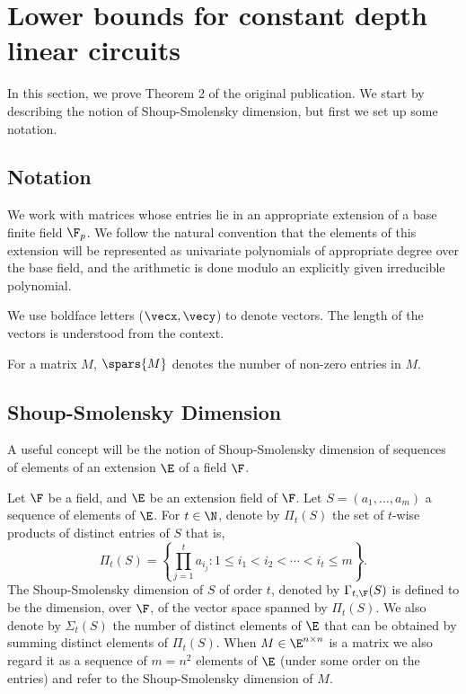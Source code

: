 \setcounter{section}{1}
\setcounter{theorem}{7}
\section{Lower bounds for constant depth linear circuits}\label{sec:shoup-smol based lb}
In this section, we prove Theorem 2 of the original publication. 
We start by describing  the notion of Shoup-Smolensky dimension, but first we set up some notation.

\subsection{Notation}
 We work with matrices whose entries lie in an appropriate extension of a base finite field $\F_p$. We follow the natural convention that the elements of this extension will be represented as univariate polynomials of appropriate degree over the base field, and the arithmetic is done modulo an explicitly given irreducible polynomial. 

We use boldface letters ($\vecx,\vecy$) to denote vectors. The length of the vectors is understood from the context.

For a matrix $M$, $\spars{M}$ denotes the number of non-zero entries in $M$. 

\subsection{Shoup-Smolensky Dimension}
\label{sec:ssdim}
A useful concept will be the notion of Shoup-Smolensky dimension of sequences of elements of an extension $\E$ of a field $\F$. 
\begin{definition}\label{def:SS-dim}
Let $\F$ be a field, and $\E$ be an extension field of $\F$. Let $S=(a_1,\ldots,a_m)$ a sequence of elements of $\E$. For $t\in\N$, denote by $\Pi_t(S)$ the set of $t$-wise products of distinct entries of $S$ that is,
\[\Pi_t(S)=\left\{\prod_{j=1}^t a_{i_j}:1\le i_1<i_2<\cdots<i_t\le m\right\}.\]
The Shoup-Smolensky dimension of $S$ of order $t$, denoted by $\Gamma_{t,\F}(S)$ is defined to be the dimension, over $\F$, of the vector space spanned by $\Pi_t(S)$.
We also denote by $\Sigma_t(S)$ the number of distinct elements of $\E$ that can be obtained by summing distinct elements of $\Pi_t(S)$.
When $M\in\E^{n\times n}$ is a matrix we also regard it as a sequence of $m=n^2$ elements of $\E$ (under some order on the entries) and refer to the Shoup-Smolensky dimension of $M$.
\end{definition}


